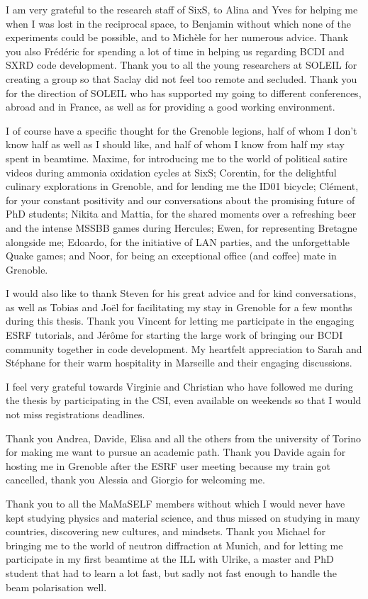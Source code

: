 I am very grateful to the research staff of SixS, to Alina and Yves for helping me when I was lost in the reciprocal space, to Benjamin without which none of the experiments could be possible, and to Michèle for her numerous advice.
Thank you also Frédéric for spending a lot of time in helping us regarding BCDI and SXRD code development.
Thank you to all the young researchers at SOLEIL for creating a group so that Saclay did not feel too remote and secluded.
Thank you for the direction of SOLEIL who has supported my going to different conferences, abroad and in France, as well as for providing a good working environment.

I of course have a specific thought for the Grenoble legions, half of whom I don't know half as well as I should like, and half of whom I know from half my stay spent in beamtime.
Maxime, for introducing me to the world of political satire videos during ammonia oxidation cycles at SixS; Corentin, for the delightful culinary explorations in Grenoble, and for lending me the ID01 bicycle; Clément, for your constant positivity and our conversations about the promising future of PhD students; Nikita and Mattia, for the shared moments over a refreshing beer and the intense MSSBB games during Hercules; Ewen, for representing Bretagne alongside me; Edoardo, for the initiative of LAN parties, and the unforgettable Quake games; and Noor, for being an exceptional office (and coffee) mate in Grenoble.

I would also like to thank Steven for his great advice and for kind conversations, as well as Tobias and Joël for facilitating my stay in Grenoble for a few months during this thesis.
Thank you Vincent for letting me participate in the engaging ESRF tutorials, and Jérôme for starting the large work of bringing our BCDI community together in code development.
My heartfelt appreciation to Sarah and Stéphane for their warm hospitality in Marseille and their engaging discussions.

I feel very grateful towards Virginie and Christian who have followed me during the thesis by participating in the CSI, even available on weekends so that I would not miss registrations deadlines.

Thank you Andrea, Davide, Elisa and all the others from the university of Torino for making me want to pursue an academic path.
Thank you Davide again for hosting me in Grenoble after the ESRF user meeting because my train got cancelled, thank you Alessia and Giorgio for welcoming me.

Thank you to all the MaMaSELF members without which I would never have kept studying physics and material science, and thus missed on studying in many countries, discovering new cultures, and mindsets.
Thank you Michael for bringing me to the world of neutron diffraction at Munich, and for letting me participate in my first beamtime at the ILL with Ulrike, a master and PhD student that had to learn a lot fast, but sadly not fast enough to handle the beam polarisation well.

